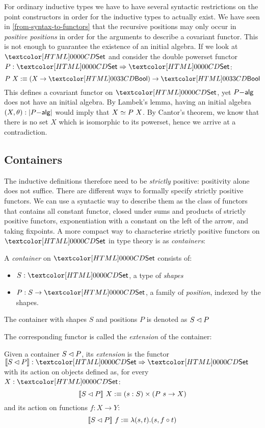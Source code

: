 For ordinary inductive types we have to have several syntactic
restrictions on the point constructors in order for the inductive
types to actually exist. We have seen in
\cref{from-syntax-to-functors} that the recursive positions may only
occur in \emph{positive positions} in order for the arguments to
describe a covariant functor. This is not enough to guarantee the
existence of an initial algebra. If we look at $\Set$ and consider the
double powerset functor $P : \Func{\Set}{\Set}$:
$$
P\ X \ddefeq (X \to \boolty) \to \boolty
$$
This defines a covariant functor on $\Set$, yet $P\mathsf{-alg}$ does not
have an initial algebra. By Lambek's lemma, having an initial algebra
$(X,\theta) : | P\mathsf{-alg} |$ would imply that $X \simeq P\ X$. By
Cantor's theorem, we know that there is no set $X$ which is isomorphic
to its powerset, hence we arrive at a contradiction.

\subsection{Containers}
The inductive definitions therefore need to be \emph{strictly}
positive: positivity alone does not suffice. There are different ways
to formally specify strictly positive functors. We can use a syntactic
way to describe them as the class of functors that contains all
constant functor, closed under sums and products of strictly positive
functors, exponentiation with a constant on the left of the arrow, and
taking fixpoints. A
more compact way to characterise strictly positive functors on $\Set$
in type theory is as \emph{containers}:
%
\begin{definition}
  A \emph{container} on $\Set$ consists of:
  \begin{itemize}
  \item $S : \Set$, a type of \emph{shapes}
  \item $P : S \to \Set$, a family of \emph{position}, indexed by the shapes.
  \end{itemize}
  The container with shapes $S$ and positions $P$ is denoted as
  $S \lhd P$
\end{definition}
%
The corresponding functor is called the \emph{extension} of the container:
%
\begin{definition}
  Given a container $S \lhd P$, its \emph{extension} is the functor
  $\context{\cont{S}{P}} : \Func{\Set}{\Set}$ with its action on objects
  defined as, for every $X : \Set$:
  $$
  \llbracket S \lhd P \rrbracket\ X :\equiv (s : S) \times (P\ s \to X)
  $$
  and its action on functions $f : X \to Y$:
  $$
  \llbracket S \lhd P \rrbracket\ f :\equiv \lambda (s , t) . (s , f \circ t)
  $$
\end{definition}

